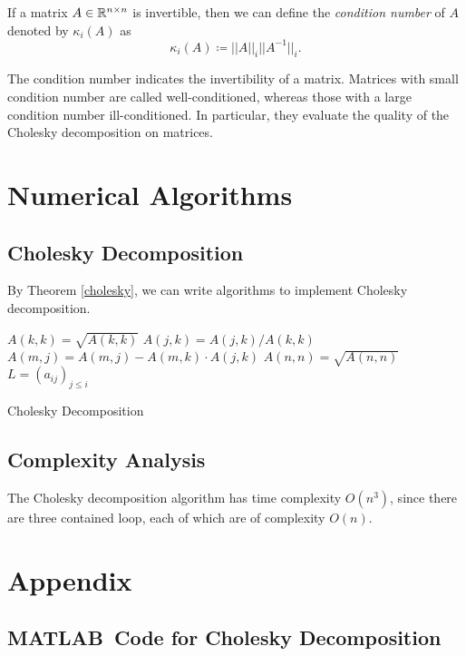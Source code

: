 \begin{definition}
If a matrix \(A\in\mathbb{R}^{n\times n}\) is invertible, then we can define the \emph{condition number} of $A$ denoted by \(\kappa_i(A)\) as
\begin{equation}
\kappa_i(A)\coloneqq||A||_i||A^{-1}||_i.
\end{equation}
\end{definition}
The condition number indicates the invertibility of a matrix.
Matrices with small condition number are called well-conditioned, whereas
those with a large condition number ill-conditioned.
In particular, they evaluate the quality of the Cholesky decomposition on matrices.
\cite{tam39}




\section{Numerical Algorithms}

\subsection{Cholesky Decomposition}
By Theorem \ref{cholesky}, we can write algorithms to implement Cholesky decomposition.
\begin{algorithm}[h]
		{
			\(A(k,k)=\sqrt{A(k,k)}\)\;
			{
				\(A(j,k)=A(j,k)/A(k,k)\)\;
			}
			{
				{
					\(A(m,j)=A(m,j)-A(m,k)\cdot A(j,k)\)\;
				}
			}
		}
		\(A(n,n)=\sqrt{A(n,n)}\)\;
		\(L=(a_{ij})_{j\leq i}\)\;
		\caption{Cholesky Decomposition}
\end{algorithm}

\subsection{Complexity Analysis}
The Cholesky decomposition algorithm has time complexity \(O\left(n^3\right)\), since there are three contained loop, each of which are of complexity \(O(n)\).


\newpage
\appendix
\section{Appendix}
\subsection{MATLAB\texttrademark\ Code for Cholesky Decomposition}
